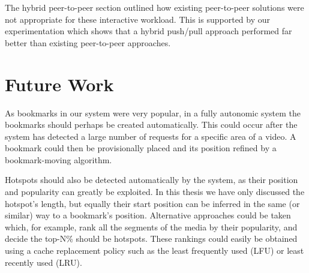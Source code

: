     The hybrid peer-to-peer section outlined how existing peer-to-peer solutions were not appropriate for these interactive workload. This is supported by our experimentation which shows that a hybrid push/pull approach performed far better than existing peer-to-peer approaches.

%
%

\section{Future Work}

    As bookmarks in our system were very popular, in a fully autonomic system the bookmarks should perhaps be created automatically. This could occur after the system has detected a large number of requests for a specific area of a video. A bookmark could then be provisionally placed and its position refined by a bookmark-moving algorithm.

    Hotspots should also be detected automatically by the system, as their position and popularity can greatly be exploited. In this thesis we have only discussed the hotspot's length, but equally their start position can be inferred in the same (or similar) way to a bookmark's position. Alternative approaches could be taken which, for example, rank all the segments of the media by their popularity, and decide the top-N\% should be hotspots. These rankings could easily be obtained using a cache replacement policy such as the least frequently used (LFU) or least recently used (LRU).

